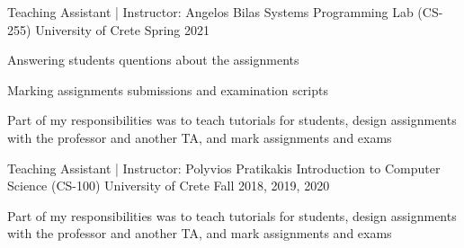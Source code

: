


\begin{cventries}

  \cventry
    {Teaching Assistant | Instructor: Angelos Bilas} %
    {Systems Programming Lab (CS-255)} %
    {University of Crete} %
    {Spring 2021} %
    {
      \begin{cvitems} %
        \item{Answering students quentions about the assignments}
        \item{Marking assignments submissions and examination scripts}
        \item{Part of my responsibilities was to teach tutorials for
            students, design assignments with the professor and
              another TA, and mark assignments and exams}
      \end{cvitems}
    }

  \cventry
    {Teaching Assistant | Instructor: Polyvios Pratikakis} %
    {Introduction to Computer Science (CS-100)} %
    {University of Crete} %
    {Fall 2018, 2019, 2020} %
    {
      \begin{cvitems} %
        \item{Part of my responsibilities was to teach tutorials for
            students, design assignments with the professor and
              another TA, and mark assignments and exams}
      \end{cvitems}
    }


\end{cventries}
